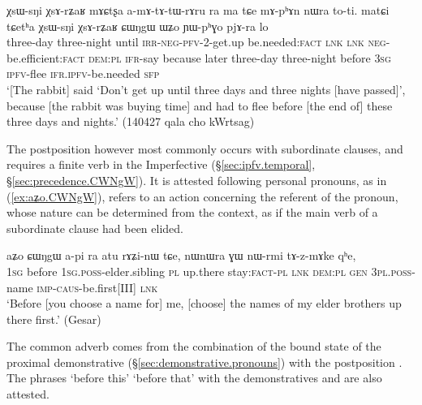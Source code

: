 \begin{exe}
\ex \label{ex:XsArZaR.CWNgW}
 \gll χsɯ-sŋi χsɤ-rʑaʁ mɤɕtʂa a-mɤ-tɤ-tɯ-rɤru ra ma tɕe mɤ-pʰɤn nɯra to-ti. matɕi tɕetʰa χsɯ-sŋi χsɤ-rʑaʁ ɕɯŋgɯ ɯʑo ɲɯ-pʰɣo pjɤ-ra lo \\
 three-day  three-night until \textsc{irr}-\textsc{neg}-\textsc{pfv}-2-get.up be.needed:\textsc{fact} \textsc{lnk} \textsc{lnk}  \textsc{neg}-be.efficient:\textsc{fact} \textsc{dem}:\textsc{pl} \textsc{ifr}-say because later   three-day  three-night before \textsc{3sg} \textsc{ipfv}-flee \textsc{ifr}.\textsc{ipfv}-be.needed \textsc{sfp} \\
 \glt `[The rabbit] said `Don't get up until three days and three nights [have passed]', because [the rabbit was buying time] and had to flee before [the end of] these three days and nights.' (140427 qala cho kWrtsag)
\end{exe}

The postposition    however most commonly occurs with subordinate clauses, and requires a finite verb in the Imperfective (§\ref{sec:ipfv.temporal}, §\ref{sec:precedence.CWNgW}). It is attested following personal pronouns, as in (\ref{ex:aʑo.CWNgW}),   refers to an action concerning the referent of the pronoun, whose nature can be determined from the context, as if the main verb of a subordinate clause had been elided.

\begin{exe}
\ex \label{ex:aʑo.CWNgW}
 \gll  aʑo ɕɯŋgɯ a-pi ra atu rɤʑi-nɯ tɕe, nɯnɯra ɣɯ nɯ-rmi tɤ-z-mɤke qʰe, \\
 \textsc{1sg} before \textsc{1sg}.\textsc{poss}-elder.sibling \textsc{pl} up.there stay:\textsc{fact}-\textsc{pl} \textsc{lnk} \textsc{dem}:\textsc{pl} \textsc{gen} \textsc{3pl}.\textsc{poss}-name \textsc{imp}-\textsc{caus}-be.first[III] \textsc{lnk} \\
 \glt `Before [you choose a name for] me, [choose] the names of my elder brothers up there first.' (Gesar)
\end{exe}


The common adverb  comes from the combination of the bound state of the proximal demonstrative  (§\ref{sec:demonstrative.pronouns}) with the postposition . The phrases  `before this'  `before that' with the demonstratives  and   are also attested.

